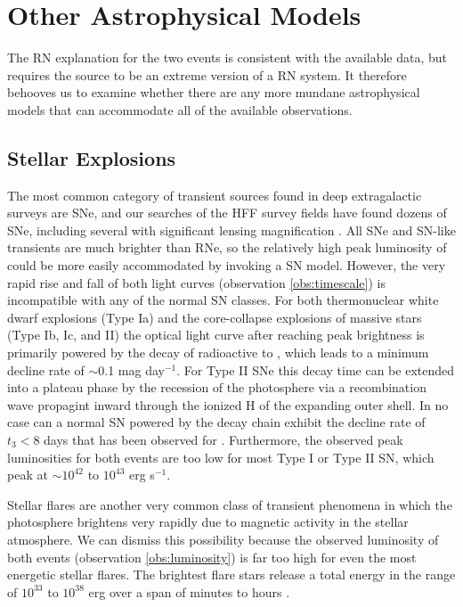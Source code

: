 \section{Other Astrophysical Models}

The RN explanation for the two \spock events is consistent with the
available data, but requires the source to be an extreme version of a
RN system.  It therefore behooves us to examine whether there are any
more mundane astrophysical models that can accommodate all of the
available observations.

\subsection{Stellar Explosions}

The most common category of transient sources found in deep
extragalactic surveys are SNe, and our searches of the HFF survey
fields have found dozens of SNe, including several with significant
lensing magnification \citep{Rodney:2015,Kelly:2015a}. All SNe and
SN-like transients are much brighter than RNe, so the relatively high
peak luminosity of \spock could be more easily accommodated by
invoking a SN model. However, the very rapid rise and fall of both
light curves (observation \ref{obs:timescale}) is incompatible with
any of the normal SN classes.  For both thermonuclear white dwarf
explosions (Type Ia) and the core-collapse explosions of massive stars
(Type Ib, Ic, and II) the optical light curve after reaching peak
brightness is primarily powered by the decay of radioactive
\NiFiftySix to \CoFiftySix, which leads to a minimum decline rate of
$\sim$0.1 mag day$^{-1}$.  For Type II SNe this decay time can be
extended into a plateau phase by the recession of the photosphere via
a recombination wave propagint inward through the ionized H of the
expanding outer shell.  In no case can a normal SN powered by the
\NiFiftySix decay chain exhibit the decline rate of $t_3<8$ days that
has been observed for \spock.  Furthermore, the observed peak
luminosities for both \spock events are too low for most Type I or
Type II SN, which peak at $\sim10^{42}$ to $10^{43}$ erg s$^{-1}$.

Stellar flares are another very common class of transient phenomena in
which the photosphere brightens very rapidly due to magnetic activity
in the stellar atmosphere.  We can dismiss this possibility because
the observed luminosity of both \spock events (observation
\ref{obs:luminosity}) is far too high for even the most energetic
stellar flares. The brightest flare stars release a total energy in
the range of $10^{33}$ to $10^{38}$ erg over a span of minutes to
hours \citep{Balona:2012,Karoff:2016}.

